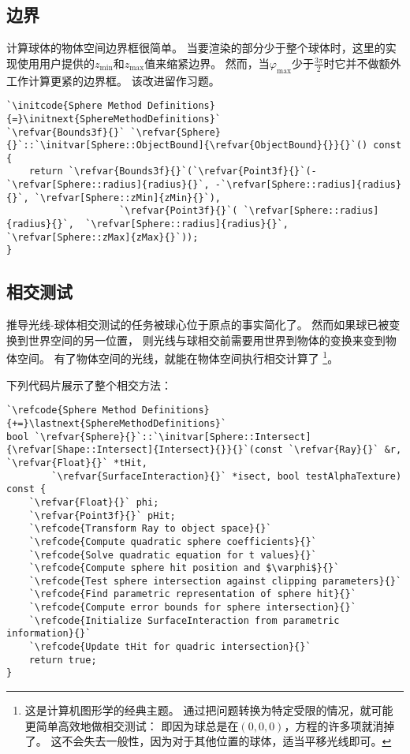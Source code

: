 \subsection{边界}\label{sub:边界2}
计算球体的物体空间边界框很简单。
当要渲染的部分少于整个球体时，这里的实现使用用户提供的$z_{\min}$和$z_{\max}$值来缩紧边界。
然而，当$\varphi_{\max}$少于$\displaystyle\frac{3\pi}{2}$时它并不做额外工作计算更紧的边界框。
该改进留作习题。
\begin{lstlisting}
`\initcode{Sphere Method Definitions}{=}\initnext{SphereMethodDefinitions}`
`\refvar{Bounds3f}{}` `\refvar{Sphere}{}`::`\initvar[Sphere::ObjectBound]{\refvar{ObjectBound}{}}{}`() const {
    return `\refvar{Bounds3f}{}`(`\refvar{Point3f}{}`(-`\refvar[Sphere::radius]{radius}{}`, -`\refvar[Sphere::radius]{radius}{}`, `\refvar[Sphere::zMin]{zMin}{}`),
                    `\refvar{Point3f}{}`( `\refvar[Sphere::radius]{radius}{}`,  `\refvar[Sphere::radius]{radius}{}`, `\refvar[Sphere::zMax]{zMax}{}`));
}
\end{lstlisting}

\subsection{相交测试}\label{sub:相交测试2}
推导光线-球体相交测试的任务被球心位于原点的事实简化了。
然而如果球已被变换到世界空间的另一位置，
则光线与球相交前需要用世界到物体的变换来变到物体空间。
有了物体空间的光线，就能在物体空间执行相交计算了
\footnote{这是计算机图形学的经典主题。
    通过把问题转换为特定受限的情况，就可能更简单高效地做相交测试：
    即因为球总是在$(0,0,0)$，方程的许多项就消掉了。
    这不会失去一般性，因为对于其他位置的球体，适当平移光线即可。}。

下列代码片展示了整个相交方法：
\begin{lstlisting}
`\refcode{Sphere Method Definitions}{+=}\lastnext{SphereMethodDefinitions}`
bool `\refvar{Sphere}{}`::`\initvar[Sphere::Intersect]{\refvar[Shape::Intersect]{Intersect}{}}{}`(const `\refvar{Ray}{}` &r, `\refvar{Float}{}` *tHit,
        `\refvar{SurfaceInteraction}{}` *isect, bool testAlphaTexture) const {
    `\refvar{Float}{}` phi;
    `\refvar{Point3f}{}` pHit;
    `\refcode{Transform Ray to object space}{}`
    `\refcode{Compute quadratic sphere coefficients}{}`
    `\refcode{Solve quadratic equation for t values}{}`
    `\refcode{Compute sphere hit position and $\varphi$}{}`
    `\refcode{Test sphere intersection against clipping parameters}{}`
    `\refcode{Find parametric representation of sphere hit}{}`
    `\refcode{Compute error bounds for sphere intersection}{}`
    `\refcode{Initialize SurfaceInteraction from parametric information}{}`
    `\refcode{Update tHit for quadric intersection}{}`
    return true;
}
\end{lstlisting}

